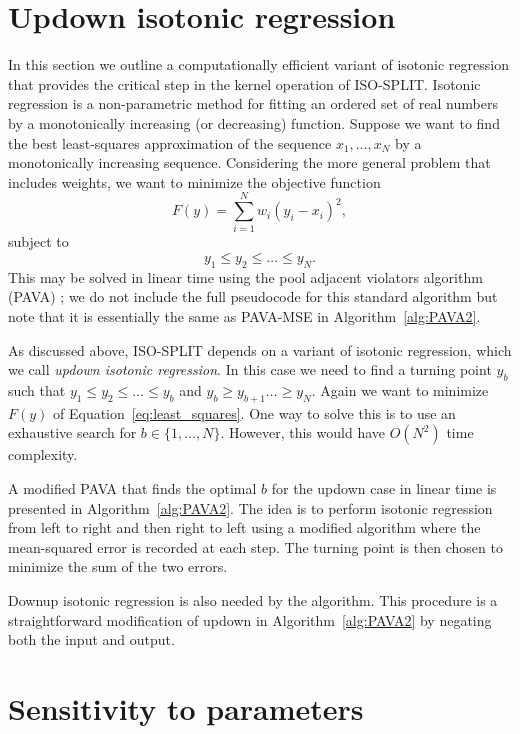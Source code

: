\documentclass[10pt]{article}
\begin{document}
\section {Updown isotonic regression}
\label{appendixUpdown}

In this section we outline a computationally efficient variant of isotonic regression that provides the critical step in the kernel operation of ISO-SPLIT. Isotonic regression is a non-parametric method for fitting an ordered set of real numbers by a monotonically increasing (or decreasing) function. Suppose we want to find the best least-squares approximation of the sequence $x_1,\dots,x_N$ by a monotonically increasing sequence. Considering the more general problem that includes weights, we want to minimize the objective function
\begin{equation}
F(y)=\sum_{i=1}^N w_i(y_i-x_i)^2,
\label{eq:least_squares}
\end{equation}
subject to
$$y_1\leq y_2\leq\dots\leq y_N.$$
This may be solved in linear time using the pool adjacent violators algorithm (PAVA) \cite{pava}; we do not include the full pseudocode for this standard algorithm but note that it is essentially the same as PAVA-MSE in Algorithm~\ref{alg:PAVA2}.

As discussed above, ISO-SPLIT depends on a variant of isotonic regression, which we call \emph{updown isotonic regression}. In this case we need to find a turning point $y_b$ such that $y_1\leq y_2\leq\dots\leq y_b$ and $y_b\geq y_{b+1}\dots\geq y_N$. Again we want to minimize $F(y)$ of Equation~\eqref{eq:least_squares}. One way to solve this is to use an exhaustive search for $b\in\{1,\dots,N\}$. However, this would have $O(N^2)$ time complexity.

A modified PAVA that finds the optimal $b$ for the updown case in linear time is presented in Algorithm~\ref{alg:PAVA2}. The idea is to perform isotonic regression from left to right and then right to left using a modified algorithm where the mean-squared error is recorded at each step. The turning point is then chosen to minimize the sum of the two errors.

Downup isotonic regression is also needed by the algorithm. This procedure is a straightforward modification of updown in Algorithm~\ref{alg:PAVA2} by negating both the input and output.




\section {Sensitivity to parameters}
\label{appendixSensitivity}
\end{document}
